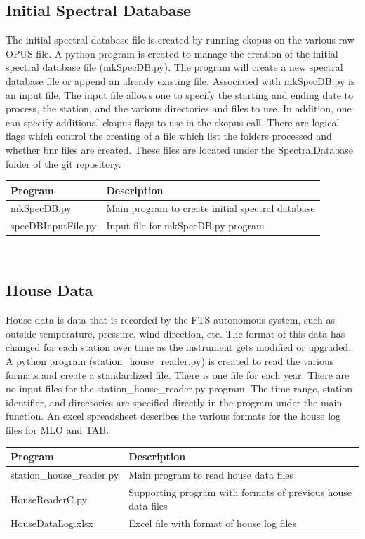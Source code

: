 \documentclass[12pt, letterpaper]{article}
\begin{document}
\subsection{Initial Spectral Database}
\label{sec:ISD}
The initial spectral database file is created by running ckopus on the various raw OPUS file. A python program is created to manage the creation of the initial spectral database file (mkSpecDB.py). The program will create a new spectral database file or append an already existing file. Associated with mkSpecDB.py is an input file. The input file allows one to specify the starting and ending date to process, the station, and the various directories and files to use. In addition, one can specify additional ckopus flags to use in the ckopus call. There are logical flags which control the creating of a file which list the folders processed and whether bnr files are created. These files are located under the SpectralDatabase folder of the git repository.\\

\begin{tabular}{ l l }
\textbf{Program} & \textbf{Description} \\
\hline
mkSpecDB.py         & Main program to create initial spectral database \\
specDBInputFile.py  & Input file for mkSpecDB.py program               \\
\end{tabular} \\


\subsection{House Data}
\label{sec:HD}

House data is data that is recorded by the FTS autonomous system, such as outside temperature, pressure, wind direction, etc. The format of this data has changed for each station over time as the instrument gets modified or upgraded. A python program (station\_house\_reader.py) is created to read the various formats and create a standardized file. There is one file for each year. There are no input files for the station\_house\_reader.py program. The time range, station identifier, and directories are specified directly in the program under the main function. An excel spreadsheet describes the various formats for the house log files for MLO and TAB.\\

\begin{tabular}{ l l }
\textbf{Program} & \textbf{Description} \\
\hline
station\_house\_reader.py & Main program to read house data files\\
HouseReaderC.py           & Supporting program with formats of previous house data files \\
HouseDataLog.xlsx         & Excel file with format of house log files\\
\end{tabular} \\
\end{document}
